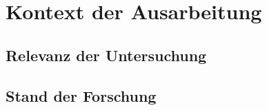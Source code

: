 \section{Kontext der Ausarbeitung}


\subsection{Relevanz der Untersuchung}


\subsection{Stand der Forschung}

